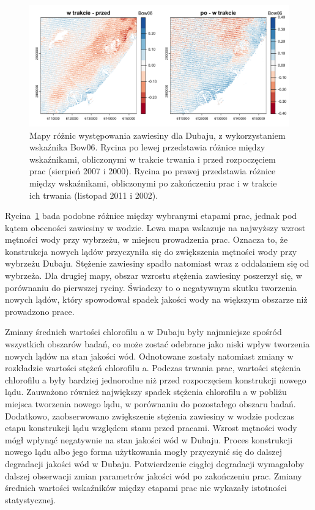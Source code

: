 \documentclass{amuthesis}
\begin{document}
\begin{figure}[t]

{\centering \includegraphics[width=6.25in,height=\textheight]{figures/dubai/bow_diff.png}

}

\caption{\label{fig-db_bow_diff}Mapy różnic występowania zawiesiny dla
Dubaju, z wykorzystaniem wskaźnika Bow06. Rycina po lewej przedstawia
różnice między wskaźnikami, obliczonymi w trakcie trwania i przed
rozpoczęciem prac (sierpień 2007 i 2000). Rycina po prawej przedstawia
różnice między wskaźnikami, obliczonymi po zakończeniu prac i w trakcie
ich trwania (listopad 2011 i 2002).}

\end{figure}

Rycina~\ref{fig-db_bow_diff} bada podobne różnice między wybranymi
etapami prac, jednak pod kątem obecności zawiesiny w wodzie. Lewa mapa
wskazuje na najwyższy wzrost mętności wody przy wybrzeżu, w miejscu
prowadzenia prac. Oznacza to, że konstrukcja nowych lądów przyczyniła
się do zwiększenia mętności wody przy wybrzeżu Dubaju. Stężenie
zawiesiny spadło natomiast wraz z oddalaniem się od wybrzeża. Dla
drugiej mapy, obszar wzrostu stężenia zawiesiny poszerzył się, w
porównaniu do pierwszej ryciny. Świadczy to o negatywnym skutku
tworzenia nowych lądów, który spowodował spadek jakości wody na większym
obszarze niż prowadzono prace.

Zmiany średnich wartości chlorofilu a w Dubaju były najmniejsze spośród
wszystkich obszarów badań, co może zostać odebrane jako niski wpływ
tworzenia nowych lądów na stan jakości wód. Odnotowane zostały natomiast
zmiany w rozkładzie wartości stężeń chlorofilu a. Podczas trwania prac,
wartości stężenia chlorofilu a były bardziej jednorodne niż przed
rozpoczęciem konstrukcji nowego lądu. Zauważono również największy
spadek stężenia chlorofilu a w pobliżu miejsca tworzenia nowego lądu, w
porównaniu do pozostałego obszaru badań. Dodatkowo, zaobserwowano
zwiększenie stężenia zawiesiny w wodzie podczas etapu konstrukcji lądu
względem stanu przed pracami. Wzrost mętności wody mógł wpłynąć
negatywnie na stan jakości wód w Dubaju. Proces konstrukcji nowego lądu
albo jego forma użytkowania mogły przyczynić się do dalszej degradacji
jakości wód w Dubaju. Potwierdzenie ciągłej degradacji wymagałoby
dalszej obserwacji zmian parametrów jakości wód po zakończeniu prac.
Zmiany średnich wartości wskaźników między etapami prac nie wykazały
istotności statystycznej.
\end{document}
